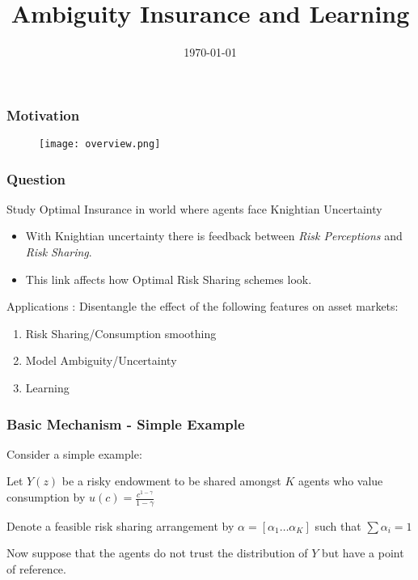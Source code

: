 \documentclass{beamer}
\title{Ambiguity Insurance and Learning}
\date{\today}
\theoremstyle{Definition}
\begin{document}
%
\begin{frame}
\titlepage
\end{frame}


\begin{frame}
\frametitle{Motivation}
\begin{figure}
  \begin{center}
   
   \texttt{[image: overview.png]}
  \end{center} 
		
	\end{figure}

\end{frame}


\begin{frame}
\frametitle{Question}
Study Optimal Insurance in world where agents face Knightian Uncertainty

\begin{itemize}
	\item With Knightian uncertainty there is feedback between \emph{Risk Perceptions} and \emph{Risk Sharing}.
	\item This link affects how Optimal Risk Sharing schemes look.
\end{itemize}

Applications : Disentangle the effect of the following features on asset markets:

\begin{enumerate}
	\item Risk Sharing/Consumption smoothing
	\item Model Ambiguity/Uncertainty
	\item Learning
\end{enumerate}

\end{frame}
\begin{frame}
\frametitle{Basic Mechanism - Simple Example}

Consider a simple example:




Let $Y(z)$ be a risky endowment to be shared amongst $K$ agents who value consumption by $u(c)=\frac{c^{1-\gamma}}{1-\gamma}$




Denote a feasible risk sharing arrangement by $\alpha = [\alpha_1 \dots \alpha_K]$ such that $\sum \alpha_i=1$




Now suppose that the agents do not trust the distribution of $Y$ but
have a point of reference. 



\end{frame}
\end{document}
